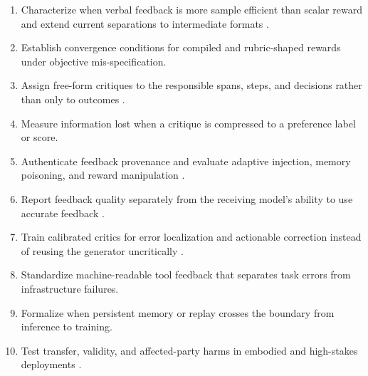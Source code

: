 \begin{enumerate}[leftmargin=1.6em]
    \item Characterize when verbal feedback is more sample efficient than scalar reward and extend current separations to intermediate formats \citep{xu2025formalizing}.
    \item Establish convergence conditions for compiled and rubric-shaped rewards under objective mis-specification.
    \item Assign free-form critiques to the responsible spans, steps, and decisions rather than only to outcomes \citep{wang2026text2gradreinforcementlearningnatural}.
    \item Measure information lost when a critique is compressed to a preference label or score.
    \item Authenticate feedback provenance and evaluate adaptive injection, memory poisoning, and reward manipulation \citep{zhan2025adaptive}.
    \item Report feedback quality separately from the receiving model's ability to use accurate feedback \citep{jiang2025feedback}.
    \item Train calibrated critics for error localization and actionable correction instead of reusing the generator uncritically \citep{mcaleese2024criticgpt}.
    \item Standardize machine-readable tool feedback that separates task errors from infrastructure failures.
    \item Formalize when persistent memory or replay crosses the boundary from inference to training.
    \item Test transfer, validity, and affected-party harms in embodied and high-stakes deployments \citep{sharma2024towards}.
\end{enumerate}
